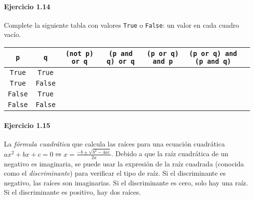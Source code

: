 \paragraph{\color{DarkBlue}Ejercicio 1.14}
Complete la siguiente tabla con valores \texttt{True} o
\texttt{False}: un valor en cada cuadro vacío.

\begin{table}[ht!]
	\centering
	\begin{tabular}{|c|c|c|c|c|c|c|}
		\hline
		\texttt{p}     & \texttt{q}
		                           & \texttt{(not p) or q}   & \texttt{(p and q) or q}
		                           & \texttt{(p or q) and p} & \texttt{(p or q) and (p and q)} \\
		\hline
		\texttt{True}  & \texttt{True}
		                           &                                     &
		                           &                                     &                                             \\
		\hline
		\texttt{True}  & \texttt{False}
		                           &                                     &
		                           &                                     &                                             \\
		\hline
		\texttt{False} & \texttt{True}
		                           &                                     &
		                           &                                     &                                             \\
		\hline
		\texttt{False} & \texttt{False}
		                           &                                     &
		                           &                                     &                                             \\
		\hline
	\end{tabular}
\end{table}

\paragraph{\color{DarkBlue}Ejercicio 1.15}
La \emph{fórmula cuadrática} que calcula las raíces para una ecuación
cuadrática $ax^{2}+bx+c=0$ es
\begin{math}
	x=
	\frac{-b\pm\sqrt{b^{2}-4ac}}{2a}
\end{math}.
Debido a que la raíz cuadrática de un negativo es imaginaria, se
puede usar la expresión de la raíz cuadrada (conocida como el
\emph{discriminante}) para verificar el tipo de raíz.
Si el discriminante es negativo, las raíces son imaginarias.
Si el discriminante es cero, solo hay una raíz.
Si el discriminante es positivo, hay dos raíces.

